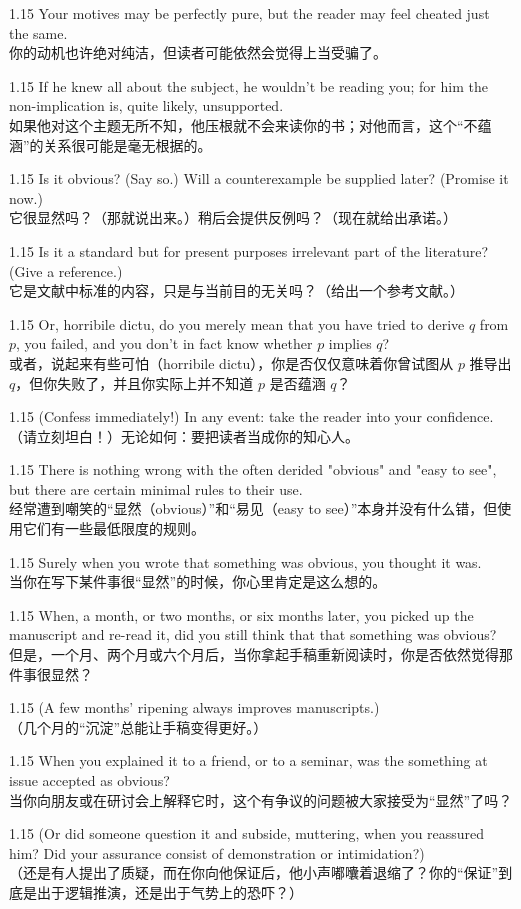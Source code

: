 \documentclass[12pt,a4paper]{article}
\newcommand{\bilingual}[2]{
    \begin{spacing}{1.15} %
        \noindent \normalsize #1 \\[-0.5ex] %
        \small \textcolor{blue!70!black}{#2} %
    \end{spacing}
    \vspace{0.8em} %
}
\begin{document}
\bilingual{Your motives may be perfectly pure, but the reader may feel cheated just the same.}
{你的动机也许绝对纯洁，但读者可能依然会觉得上当受骗了。} %

\bilingual{If he knew all about the subject, he wouldn't be reading you; for him the non-implication is, quite likely, unsupported.}
{如果他对这个主题无所不知，他压根就不会来读你的书；对他而言，这个“不蕴涵”的关系很可能是毫无根据的。} %

\bilingual{Is it obvious? (Say so.) Will a counterexample be supplied later? (Promise it now.)}
{它很显然吗？（那就说出来。）稍后会提供反例吗？（现在就给出承诺。）} %

\bilingual{Is it a standard but for present purposes irrelevant part of the literature? (Give a reference.)}
{它是文献中标准的内容，只是与当前目的无关吗？（给出一个参考文献。）} %

\bilingual{Or, horribile dictu, do you merely mean that you have tried to derive $q$ from $p$, you failed, and you don't in fact know whether $p$ implies $q$?}
{或者，说起来有些可怕（horribile dictu），你是否仅仅意味着你曾试图从 $p$ 推导出 $q$，但你失败了，并且你实际上并不知道 $p$ 是否蕴涵 $q$？} %

\bilingual{(Confess immediately!) In any event: take the reader into your confidence.}
{（请立刻坦白！）无论如何：要把读者当成你的知心人。} %

\bilingual{There is nothing wrong with the often derided "obvious" and "easy to see", but there are certain minimal rules to their use.}
{经常遭到嘲笑的“显然（obvious）”和“易见（easy to see）”本身并没有什么错，但使用它们有一些最低限度的规则。} %

\bilingual{Surely when you wrote that something was obvious, you thought it was.}
{当你在写下某件事很“显然”的时候，你心里肯定是这么想的。} %

\bilingual{When, a month, or two months, or six months later, you picked up the manuscript and re-read it, did you still think that that something was obvious?}
{但是，一个月、两个月或六个月后，当你拿起手稿重新阅读时，你是否依然觉得那件事很显然？} %

\bilingual{(A few months' ripening always improves manuscripts.)}
{（几个月的“沉淀”总能让手稿变得更好。）} %

\bilingual{When you explained it to a friend, or to a seminar, was the something at issue accepted as obvious?}
{当你向朋友或在研讨会上解释它时，这个有争议的问题被大家接受为“显然”了吗？} %

\bilingual{(Or did someone question it and subside, muttering, when you reassured him? Did your assurance consist of demonstration or intimidation?)}
{（还是有人提出了质疑，而在你向他保证后，他小声嘟囔着退缩了？你的“保证”到底是出于逻辑推演，还是出于气势上的恐吓？）} %
\end{document}
